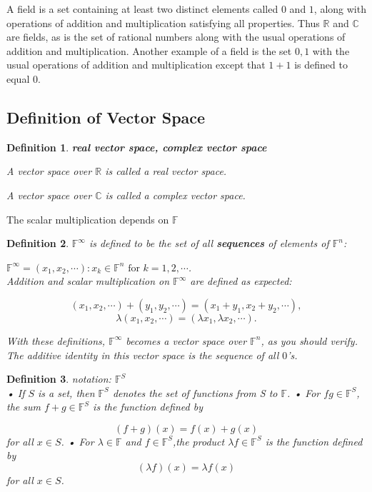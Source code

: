 \documentclass{article}
\newtheorem{definition}{Definition}[subsection]
\newcommand{\RR}{\mathbb{R}}
\newcommand{\CC}{\mathbb{C}}
\newcommand{\FF}{\mathbb{F}}
\begin{document}
\begin{CJK}{UTF8}{gkai}
    A field is a set containing at least two distinct elements called $0$ and $1$, along with
 operations of addition and multiplication satisfying all properties.
 Thus $\RR$ and $\CC$ are fields, as is the set of rational numbers along with the usual
 operations of addition and multiplication. Another example of a field is the set
 ${0, 1}$ with the usual operations of addition and multiplication except that $1 + 1$ is
 defined to equal $0$.

\subsection{Definition of Vector Space}

\begin{definition}
    \textbf{real vector space, complex vector space}

    A vector space over $\RR$ is called a real vector space.

    A vector space over $\CC$ is called a complex vector space.
\end{definition}

The scalar multiplication depends on $\FF$

\begin{definition}
    $\FF^\infty$ is defined to be the set of all \textbf{sequences} of elements of $\FF^n$:

    $\FF^{\infty} = {(x_1,x_2,\cdots) : x_k \in \FF^n \text{~for~} k = 1,2,\cdots}$.\\

    Addition and scalar multiplication on $\FF^\infty$ are defined as expected:

    \[(x_1, x_2, \cdots) + (y_1,y_2,\cdots) = (x_1 +y_1,x_2 +y_2,\cdots),\]
    \[\lambda (x_1,x_2,\cdots) = (\lambda x_1, \lambda x_2,\cdots).\]

    With these definitions, $\FF^\infty$ becomes a vector space over $\FF^n$, as you should verify.
    The additive identity in this vector space is the sequence of all $0$'s.
\end{definition}

\begin{definition}
    notation: $\FF^S$\\

 • If $S$ is a set, then $\FF^S$ denotes the set of functions from S to $\FF$.
 • For $fg \in \FF^S$, the sum $f+g \in \FF^S$ is the function defined by

 \[( f +g)(x) = f(x)+g(x)\]
 for all $x \in S$.
 • For $\lambda  \in \FF$ and $f \in \FF^S$,the product $\lambda f \in \FF^S$ is the function defined by
 \[(\lambda f)(x) = \lambda f(x)\]
 for all $x \in S$.
\end{definition}


\end{CJK}
\end{document}
